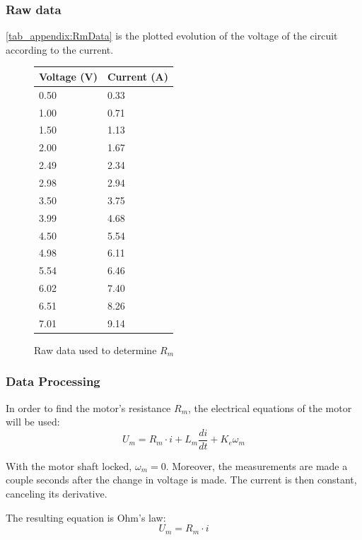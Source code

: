 \subsubsection*{Raw data}
\autoref{tab_appendix:RmData} is the plotted evolution of the voltage of the circuit according to the current.

\begin{figure}[htbp]
	\centering
	\caption{Raw data used to determine $R_m$}\label{tab_appendix:RmData}
	\begin{tabularx}{0.35\textwidth}{XX}
		Voltage (V) & Current (A)\\ \toprule \rowcolor{lightGrey}
		0.50 & 0.33 \\
		1.00 & 0.71 \\ \rowcolor{lightGrey}
		1.50 & 1.13 \\
		2.00 & 1.67 \\ \rowcolor{lightGrey}
		2.49 & 2.34 \\
		2.98 & 2.94 \\ \rowcolor{lightGrey}
		3.50 & 3.75 \\
		3.99 & 4.68 \\ \rowcolor{lightGrey}
		4.50 & 5.54 \\
		4.98 & 6.11 \\ \rowcolor{lightGrey}
		5.54 & 6.46 \\
		6.02 & 7.40 \\ \rowcolor{lightGrey}
		6.51 & 8.26 \\
		7.01 & 9.14 
	\end{tabularx}
\end{figure}

\subsubsection{Data Processing}
In order to find the motor's resistance $R_m$, the electrical equations of the motor will be used:
\begin{equation}
	U_m = R_m \cdot i + L_m \frac{di}{dt} + K_e\omega_m
\end{equation}

With the motor shaft locked, $\omega_m = 0$. Moreover, the measurements are made a couple seconds after the change in voltage is made. The current is then constant, canceling its derivative. 

The resulting equation is Ohm's law:
\begin{equation}
U_m = R_m \cdot i
\end{equation}

